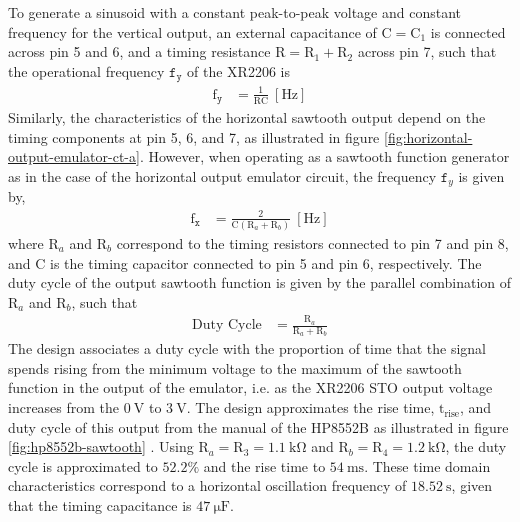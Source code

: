 \documentclass[class=report,11pt,crop=false]{standalone}
\begin{document}
	To generate a sinusoid with a constant peak-to-peak voltage and constant frequency for the vertical output, an external capacitance of $\text{C} = \text{C}_1$ is connected across pin 5 and 6, and a timing resistance $\text{R} = \text{R}_1 + \text{R}_2$ across pin 7, such that the operational frequency $\texttt{f}_\texttt{y}$ of the XR2206 is 
	\begin{align}\label{eqn:xr2206-sinewave-frequency}
		\text{f}_\texttt{y}	& = \frac{1}{\text{R}\text{C}} ~ [\si{\hertz}]
	\end{align}
	Similarly, the characteristics of the horizontal sawtooth output depend on the timing components at pin 5, 6, and 7, as illustrated in figure \ref{fig:horizontal-output-emulator-ct-a}. However, when operating as a sawtooth function generator as in the case of the horizontal output emulator circuit, the frequency $\texttt{f}_y$ is given by,
	\begin{align}\label{eqn:xr2206-sawtooth-frequency}
		\text{f}_\texttt{x}	& = \frac{2}{\text{C}(\text{R}_a + \text{R}_b)} ~ [\si{\hertz}]
	\end{align}
	where $\text{R}_a$ and $\text{R}_b$ correspond to the timing resistors connected to pin 7 and pin 8, and $\text{C}$ is the timing capacitor connected to pin 5 and pin 6, respectively. The duty cycle of the output sawtooth function is given by the parallel combination of $\text{R}_a$ and $\text{R}_b$, such that 
	\begin{align}\label{eqn:xr2206-duty-cycle}
		\text{Duty Cycle}	& = \frac{\text{R}_a}{\text{R}_a + \text{R}_b}
	\end{align}
	The design associates a duty cycle with the proportion of time that the signal spends rising from the minimum voltage to the maximum of the sawtooth function in the output of the emulator, i.e. as the XR2206 STO output voltage increases from the $\SI{0}{\volt}$ to $\SI{3}{\volt}$. The design approximates the rise time, $\text{t}_\text{rise}$, and duty cycle of this output from the manual of the HP8552B as illustrated in figure \ref{fig:hp8552b-sawtooth} \cite{hp8552b}. Using $\text{R}_a = \text{R}_3 = \SI{1.1}{\kilo\ohm}$ and $\text{R}_b = \text{R}_4 = \SI{1.2}{\kilo\ohm}$, the duty cycle is approximated to $52.2\%$ and the rise time to $\SI{54}{\milli\second}$. These time domain characteristics correspond to a horizontal oscillation frequency of $\SI{18.52}{\second}$, given that the timing capacitance is $\SI{47}{\micro\farad}$. 
\end{document}
